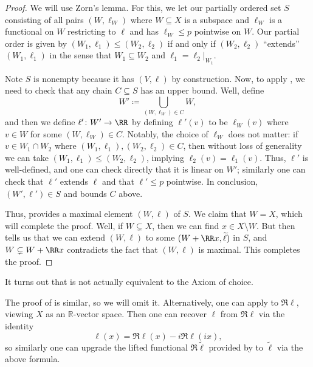 \documentclass[../notes.tex]{subfiles}
\begin{document}
\begin{proof}
	We will use Zorn's lemma. For this, we let our partially ordered set $S$ consisting of all pairs $(W,\ell_W)$ where $W\subseteq X$ is a subspace and $\ell_W$ is a functional on $W$ restricting to $\ell$ and has $\ell_W\le p$ pointwise on $W$. Our partial order is given by $(W_1,\ell_1)\le(W_2,\ell_2)$ if and only if $(W_2,\ell_2)$ ``extends'' $(W_1,\ell_1)$ in the sense that $W_1\subseteq W_2$ and $\ell_1=\ell_2|_{W_1}$.

	Note $S$ is nonempty because it has $(V,\ell)$ by construction. Now, to apply , we need to check that any chain $C\subseteq S$ has an upper bound. Well, define
	\[W'\coloneqq\bigcup_{(W,\ell_W)\in C}W,\]
	and then we define $\ell'\colon W'\to\RR$ by defining $\ell'(v)$ to be $\ell_W(v)$ where $v\in W$ for some $(W,\ell_W)\in C$. Notably, the choice of $\ell_W$ does not matter: if $v\in W_1\cap W_2$ where $(W_1,\ell_1),(W_2,\ell_2)\in C$, then without loss of generality we can take $(W_1,\ell_1)\le(W_2,\ell_2)$, implying $\ell_2(v)=\ell_1(v)$. Thus, $\ell'$ is well-defined, and one can check directly that it is linear on $W'$; similarly one can check that $\ell'$ extends $\ell$ and that $\ell'\le p$ pointwise. In conclusion, $(W',\ell')\in S$ and bounds $C$ above.

	Thus,  provides a maximal element $(W,\ell)$ of $S$. We claim that $W=X$, which will complete the proof. Well, if $W\subsetneq X$, then we can find $x\in X\setminus W$. But then  tells us that we can extend $(W,\ell)$ to some $(W+\RR x,\widetilde\ell)$ in $S$, and $W\subsetneq W+\RR x$ contradicts the fact that $(W,\ell)$ is maximal. This completes the proof.
\end{proof}
\begin{remark}
	It turns out that  is not actually equivalent to the Axiom of choice.
\end{remark}
\begin{remark}
	The proof of  is similar, so we will omit it. Alternatively, one can apply  to $\Re\ell$, viewing $X$ as an $\mathbb R$-vector space. Then one can recover $\ell$ from $\Re\ell$ via the identity
	\[\ell(x)=\Re\ell(x)-i\Re\ell(ix),\]
	so similarly one can upgrade the lifted functional $\Re\widetilde\ell$ provided by  to $\widetilde\ell$ via the above formula.
\end{remark}
\end{document}
